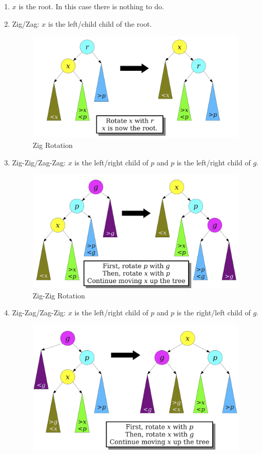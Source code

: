 \documentclass[12pt]{article}
\begin{document}
\begin{enumerate}
  \item $x$ is the root. In this case there is nothing to do.
  \item Zig/Zag: $x$ is the left/child child of the root.
    \begin{figure}[!ht]
      \centering
      \includegraphics[scale=0.16]{pics/splay_tree/zig}
      \caption{Zig Rotation}
    \end{figure}
  \item Zig-Zig/Zag-Zag: $x$ is the left/right child of $p$ and $p$ is the left/right child of $g$. \\
    \begin{figure}[!ht]
      \centering
      \includegraphics[scale=0.16]{pics/splay_tree/zig_zig}
      \caption{Zig-Zig Rotation}
    \end{figure}
  \item Zig-Zag/Zag-Zig: $x$ is the left/right child of $p$ and $p$ is the right/left child of $g$. \\
    \begin{figure}[!ht]
      \centering
      \includegraphics[scale=0.16]{pics/splay_tree/zig_zag}

\end{figure}
\end{enumerate}
\end{document}
